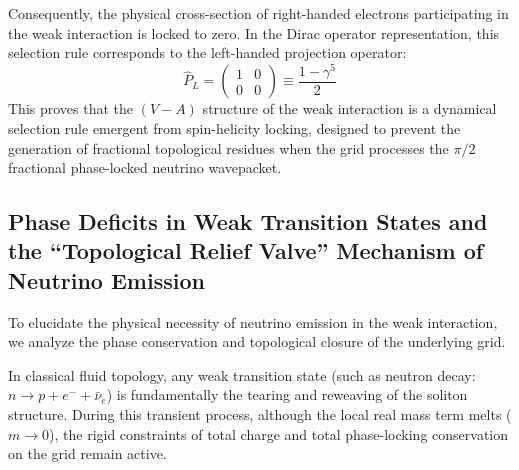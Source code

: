 \documentclass[12pt, a4paper]{article}
\begin{document}
Consequently, the physical cross-section of right-handed electrons participating in the weak interaction is locked to zero. In the Dirac operator representation, this selection rule corresponds to the left-handed projection operator:
\begin{equation}
\hat{P}_L = \begin{pmatrix} 1 & 0 \\ 0 & 0 \end{pmatrix} \equiv \frac{1 - \gamma^5}{2} \label{eq:left_projection}
\end{equation}
This proves that the $(V-A)$ structure of the weak interaction is a dynamical selection rule emergent from spin-helicity locking, designed to prevent the generation of fractional topological residues when the grid processes the $\pi/2$ fractional phase-locked neutrino wavepacket.

\subsection{Phase Deficits in Weak Transition States and the ``Topological Relief Valve'' Mechanism of Neutrino Emission}

To elucidate the physical necessity of neutrino emission in the weak interaction, we analyze the phase conservation and topological closure of the underlying grid.

In classical fluid topology, any weak transition state (such as neutron decay: $n \to p + e^- + \bar{\nu}_e$) is fundamentally the tearing and reweaving of the soliton structure. During this transient process, although the local real mass term melts ($m \to 0$), the rigid constraints of total charge and total phase-locking conservation on the grid remain active.
\end{document}
